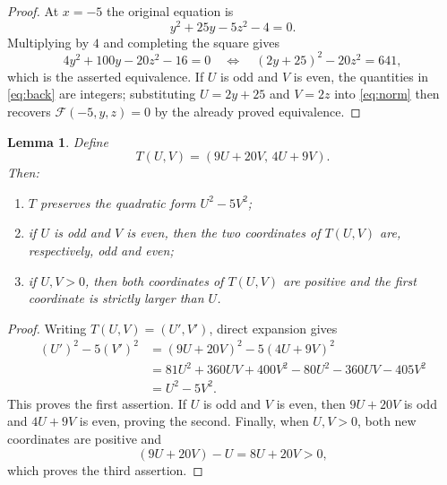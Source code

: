 \documentclass[11pt]{article}
\newtheorem{lemma}{Lemma}
\theoremstyle{remark}
\newcommand{\F}{\mathcal F}
\begin{document}
\begin{proof}
At $x=-5$ the original equation is
\[
 y^2+25y-5z^2-4=0.
\]
Multiplying by $4$ and completing the square gives
\[
 4y^2+100y-20z^2-16=0
 \quad\Longleftrightarrow\quad
 (2y+25)^2-20z^2=641,
\]
which is the asserted equivalence.  If $U$ is odd and $V$ is even, the quantities in
\eqref{eq:back} are integers; substituting $U=2y+25$ and $V=2z$ into
\eqref{eq:norm} then recovers $\F(-5,y,z)=0$ by the already proved equivalence.
\end{proof}

\begin{lemma}\label{lem:map}
Define
\begin{equation}\label{eq:T}
 T(U,V)=(9U+20V,\,4U+9V).
\end{equation}
Then:
\begin{enumerate}
\item $T$ preserves the quadratic form $U^2-5V^2$;
\item if $U$ is odd and $V$ is even, then the two coordinates of $T(U,V)$ are,
respectively, odd and even;
\item if $U,V>0$, then both coordinates of $T(U,V)$ are positive and the first
coordinate is strictly larger than $U$.
\end{enumerate}
\end{lemma}

\begin{proof}
Writing $T(U,V)=(U',V')$, direct expansion gives
\begin{align*}
 (U')^2-5(V')^2
 &=(9U+20V)^2-5(4U+9V)^2\\
 &=81U^2+360UV+400V^2
   -80U^2-360UV-405V^2\\
 &=U^2-5V^2.
\end{align*}
This proves the first assertion.  If $U$ is odd and $V$ is even, then
$9U+20V$ is odd and $4U+9V$ is even, proving the second.  Finally, when $U,V>0$,
both new coordinates are positive and
\[
 (9U+20V)-U=8U+20V>0,
\]
which proves the third assertion.
\end{proof}
\end{document}
